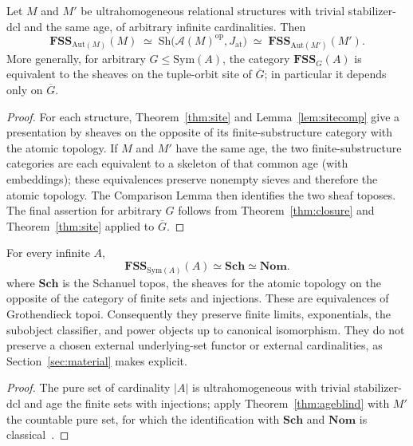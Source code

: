 \documentclass{lmcs}
\newcommand{\Sym}{\mathrm{Sym}}
\newcommand{\Aut}{\mathrm{Aut}}
\newcommand{\Nom}{\mathbf{Nom}}
\newcommand{\FSS}{\mathbf{FSS}}
\newcommand{\Sch}{\mathbf{Sch}}
\begin{document}
\begin{thm}\label{thm:ageblind}
Let $M$ and $M'$ be ultrahomogeneous relational structures with trivial
stabilizer-dcl and the same age, of arbitrary infinite cardinalities.
Then
\[
\FSS_{\Aut(M)}(M)\;\simeq\;
\mathrm{Sh}\bigl(\mathcal A(M)^{\mathrm{op}},
J_{\mathrm{at}}\bigr)\;\simeq\;\FSS_{\Aut(M')}(M').
\]
More generally, for arbitrary $G\leq\Sym(A)$, the category
$\FSS_G(A)$ is equivalent to the sheaves on the tuple-orbit site of
$\overline G$; in particular it depends only on $\overline G$.
\end{thm}

\begin{proof}
For each structure, Theorem~\ref{thm:site} and Lemma~\ref{lem:sitecomp}
give a presentation by sheaves on the opposite of its finite-substructure
category with the atomic topology. If $M$ and $M'$ have the same age, the
two finite-substructure categories are each equivalent to a skeleton of that
common age (with embeddings); these equivalences preserve nonempty sieves and
therefore the atomic topology. The Comparison Lemma then identifies the two
sheaf toposes. The final assertion for arbitrary $G$ follows from
Theorem~\ref{thm:closure} and Theorem~\ref{thm:site} applied to
$\overline G$.
\end{proof}

\begin{cor}\label{thm:regime}
For every infinite $A$,
\[\FSS_{\Sym(A)}(A)\simeq\Sch\simeq\Nom.\]
where $\Sch$ is the Schanuel topos, the sheaves for the atomic topology on the opposite of the category of finite sets and injections. These are equivalences of Grothendieck topoi. Consequently they preserve finite limits, exponentials, the subobject classifier, and power objects up to
canonical isomorphism. They do not preserve a chosen external
underlying-set functor or external cardinalities, as
Section~\ref{sec:material} makes explicit.
\end{cor}

\begin{proof}
The pure set of cardinality $|A|$ is ultrahomogeneous with trivial
stabilizer-dcl and age the finite sets with injections; apply
Theorem~\ref{thm:ageblind} with $M'$ the countable pure set, for which the identification with $\Sch$ and $\Nom$ is classical~\cite{Johnstone02,Pitts13}.
\end{proof}
\end{document}
